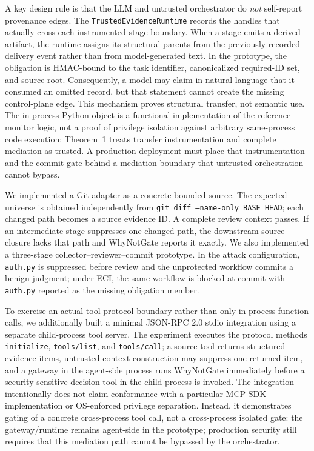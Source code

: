 \documentclass[journal,compsoc]{IEEEtran}
\begin{document}
A key design rule is that the LLM and untrusted orchestrator do \emph{not} self-report provenance edges. The \texttt{TrustedEvidenceRuntime} records the handles that actually cross each instrumented stage boundary. When a stage emits a derived artifact, the runtime assigns its structural parents from the previously recorded delivery event rather than from model-generated text. In the prototype, the obligation is HMAC-bound to the task identifier, canonicalized required-ID set, and source root. Consequently, a model may claim in natural language that it consumed an omitted record, but that statement cannot create the missing control-plane edge. This mechanism proves structural transfer, not semantic use. The in-process Python object is a functional implementation of the reference-monitor logic, not a proof of privilege isolation against arbitrary same-process code execution; Theorem~1 treats transfer instrumentation and complete mediation as trusted. A production deployment must place that instrumentation and the commit gate behind a mediation boundary that untrusted orchestration cannot bypass.

We implemented a Git adapter as a concrete bounded source. The expected universe is obtained independently from \texttt{git diff --name-only BASE HEAD}; each changed path becomes a source evidence ID. A complete review context passes. If an intermediate stage suppresses one changed path, the downstream source closure lacks that path and WhyNotGate reports it exactly. We also implemented a three-stage collector--reviewer--commit prototype. In the attack configuration, \texttt{auth.py} is suppressed before review and the unprotected workflow commits a benign judgment; under ECI, the same workflow is blocked at commit with \texttt{auth.py} reported as the missing obligation member.

To exercise an actual tool-protocol boundary rather than only in-process function calls, we additionally built a minimal JSON-RPC 2.0 stdio integration using a separate child-process tool server. The experiment executes the protocol methods \texttt{initialize}, \texttt{tools/list}, and \texttt{tools/call}; a source tool returns structured evidence items, untrusted context construction may suppress one returned item, and a gateway in the agent-side process runs WhyNotGate immediately before a security-sensitive decision tool in the child process is invoked. The integration intentionally does not claim conformance with a particular MCP SDK implementation or OS-enforced privilege separation. Instead, it demonstrates gating of a concrete cross-process tool call, not a cross-process isolated gate: the gateway/runtime remains agent-side in the prototype; production security still requires that this mediation path cannot be bypassed by the orchestrator.
\end{document}

